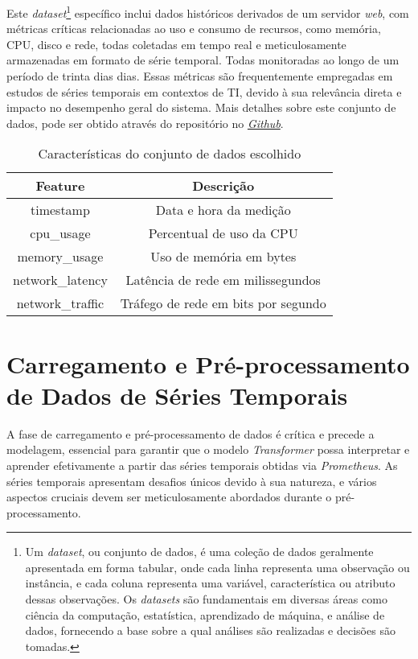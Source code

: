 Este \textit{dataset}\footnote{Um \textit{dataset}, ou conjunto de dados, é uma coleção de dados geralmente apresentada em forma tabular, onde cada linha representa uma observação ou instância, e cada coluna representa uma variável, característica ou atributo dessas observações. Os \textit{datasets} são fundamentais em diversas áreas como ciência da computação, estatística, aprendizado de máquina, e análise de dados, fornecendo a base sobre a qual análises são realizadas e decisões são tomadas.} específico inclui dados históricos derivados de um servidor \textit{web}, com métricas críticas relacionadas ao uso e consumo de recursos, como memória, CPU, disco e rede, todas coletadas em tempo real e meticulosamente armazenadas em formato de série temporal. Todas monitoradas ao longo de um período de trinta dias dias. Essas métricas são frequentemente empregadas em estudos de séries temporais em contextos de TI, devido à sua relevância direta e impacto no desempenho geral do sistema. Mais detalhes sobre este conjunto de dados, pode ser obtido através do repositório no \textit{\href{https://github.com/weslleyrosalem/dissertacao/tree/main/Experiments/data}{Github}}.

\begin{table}[h!]
    \centering
    \caption{Características do conjunto de dados escolhido}
    \begin{tabular}{|c|c|}
        \hline
        \textbf{Feature} & \textbf{Descrição} \\
        \hline
        timestamp & Data e hora da medição \\
        \hline
        cpu\_usage & Percentual de uso da CPU \\
        \hline
        memory\_usage & Uso de memória em bytes \\
        \hline
        network\_latency & Latência de rede em milissegundos \\
        \hline
        network\_traffic & Tráfego de rede em bits por segundo \\
        \hline
    \end{tabular}
    \label{tab:dataset_features}
\end{table}


\section{Carregamento e Pré-processamento de Dados de Séries Temporais}

A fase de carregamento e pré-processamento de dados  é crítica e precede a modelagem, essencial para garantir que o modelo \textit{Transformer} possa interpretar e aprender efetivamente a partir das séries temporais obtidas via \textit{Prometheus}. As séries temporais apresentam desafios únicos devido à sua natureza, e vários aspectos cruciais devem ser meticulosamente abordados durante o pré-processamento.

